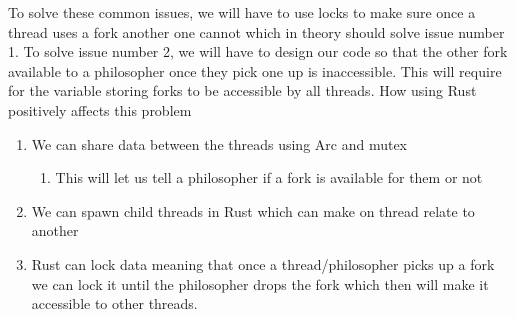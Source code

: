 \documentclass[conference]{IEEEtran}
\begin{document}
	 To solve these common issues, we will have to use locks to make sure once a thread uses a fork another one cannot which in theory should solve issue number 1. To solve issue number 2, we will have to design our code so that the other fork available to a philosopher once they pick one up is inaccessible. This will require for the variable storing forks to be accessible by all threads.
	 \linebreak
      \linebreak
	 How using Rust positively affects this problem
	 \begin{enumerate}
	 	\item We can share data between the threads using Arc and mutex
	 	\begin{enumerate}
	 		
	 		\item This will let us tell a philosopher if a fork is available for them or not
	 	\end{enumerate}
	 	\item We can spawn child threads in Rust which can make on thread relate to another
	 	\item Rust can lock data meaning that once a thread/philosopher picks up a fork we can lock it until the philosopher drops the fork which then will make it accessible to other threads.
	\end{enumerate}
\end{document}
